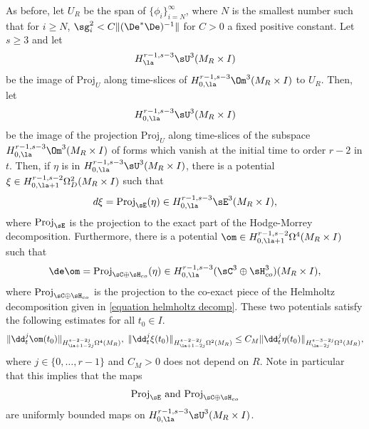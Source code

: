 \documentclass[hidelinks, 12pt, oneside, reqno]{amsart}
\begin{document}

\begin{prop}\label{proposition boundedness of restricted forms}
As before, let $U_R$ be the span of $\{\phi_i\}_{i= N}^\infty$, where $N$ is the smallest number such that for $i \ge N$,  $\sg_i^2 < C \|(\De^*\De)^{-1}\|$ for $C>0$ a fixed positive constant. Let $s \ge 3$ and let
\[
H_{\la}^{r-1,s-3}\sU^3(M_R \times I)
\]
be the image of $\mathrm{Proj}_U$ along time-slices of $H_{0,\la}^{r-1,s-3}\Om^3(M_R \times I)$ to $U_R$. Then, let 
\[
H_{0,\la}^{r-1,s-3}\sU^3(M_R \times I)
\]
be the image of the projection $\mathrm{Proj}_U$ along time-slices of the subspace $H_{0,\la}^{r-1,s-3}\Om^3(M_R \times I)$ of forms which vanish at the initial time to order $r-2$ in $t$. Then, if $\eta$ is in $H_{0,\la}^{r-1,s-3}\sU^3(M_R \times I)$, there is a potential $\xi \in H_{0,\la+1}^{r-1,s-2}\Omega_D^2(M_R \times I)$ such that
\[
d\xi = \mathrm{Proj}_{\sE} (\eta) \in H_{0,\la}^{r-1,s-3}\sE^3(M_R \times I),
\]
where $\mathrm{Proj}_{\sE}$ is the projection to the exact part of the Hodge-Morrey decomposition. Furthermore, there is a potential $\om \in H_{0,\la+1}^{r-1,s-2}\Omega^4(M_R \times I)$ such that 
\[
\de \om = \mathrm{Proj}_{\sC \oplus \sH_{co}} (\eta) \in H_{0,\la}^{r-1,s-3}(\sC^3 \oplus \sH_{co}^3) (M_R \times I),
\]
where $\mathrm{Proj}_{\sC \oplus \sH_{co}}$ is the projection to the co-exact piece of the Helmholtz decomposition given in \eqref{equation helmholtz decomp}. These two potentials satisfy the following estimates for all $t_0 \in I$. 
\begin{align}\label{equation timeslice potential estimates}
\|\dd_t^j \om (t_0)\|_{H_{\la+1 - 2j}^{s-2-2j}\Omega^4(M_R)},\; \|\dd_t^j \xi (t_0)\|_{H_{\la+1 - 2j}^{s-2-2j}\Omega^2(M_R)} \le C_M \|\dd_t^j \eta (t_0)\|_{H_{\la-2j}^{s-3-2j}\Omega^3(M_R)},
\end{align}
where $j \in \{0, \ldots, r-1\}$ and $C_M > 0$ does not depend on $R$. Note in particular that this implies that the maps 
\[
\mathrm{Proj}_{\sE} \text{ and } \mathrm{Proj}_{\sC \oplus \sH_{co}}
\]
are uniformly bounded maps on $H_{0,\la}^{r-1,s-3}\sU^3(M_R \times I)$.
\end{prop}
\end{document}
